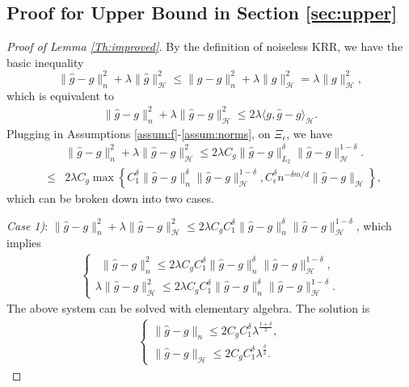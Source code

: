 \documentclass[12pt]{article}
\theoremstyle{plain}
\theoremstyle{remark}
\begin{document}
\subsection{Proof for Upper Bound in Section \ref{sec:upper}} \label{sub:upp}
 \begin{proof}[Proof of Lemma \ref{Th:improved}]
    By the definition of noiseless KRR, we have the basic inequality
\[\|\hat{g}-g\|_n^2+\lambda \|\hat{g}\|^2_{\mathcal{H}}\leq \|g-g\|^2_n + \lambda \|g\|^2_\mathcal{H}=\lambda \|g\|^2_\mathcal{H},\]
which is equivalent to
\begin{eqnarray*}
    \|\hat{g}-g\|_n^2+\lambda \|\hat{g}-g\|^2_{\mathcal{H}}\leq 2 \lambda \langle g, \hat{g}-g\rangle_{\mathcal{H}}.
\end{eqnarray*}
Plugging in Assumptions \ref{assum:f}-\ref{assum:norms}, on $\Xi_\epsilon$, we have
\begin{eqnarray*}
    &&\|\hat{g}-g\|_n^2+\lambda \|\hat{g}-g\|^2_{\mathcal{H}}\leq 2 \lambda C_g \|\hat{g}-g\|_{L_2}^{\delta}\|\hat{g}-g\|_{\mathcal{H}}^{1-\delta}.\\
    &\leq& 2 \lambda C_g\max\left\{C_1^\delta\|\hat{g}-g\|^{\delta}_n\|\hat{g}-g\|_{\mathcal{H}}^{1-\delta},C_\epsilon^\delta n^{-\delta m/d}\|\hat{g}-g\|_{\mathcal{H}}\right\},
\end{eqnarray*}
which can be broken down into two cases.

\textit{Case 1)}: $\|\hat{g}-g\|_n^2+\lambda \|\hat{g}-g\|^2_{\mathcal{H}}\leq 2 \lambda C_gC_1^\delta\|\hat{g}-g\|^{\delta}_n\|\hat{g}-g\|_{\mathcal{H}}^{1-\delta}$, which implies
\begin{eqnarray}\label{needed_for_lower}
    \begin{cases}
        ~~\|\hat{g}-g\|_n^2\leq 2 \lambda C_gC_1^\delta\|\hat{g}-g\|^{\delta}_n\|\hat{g}-g\|_{\mathcal{H}}^{1-\delta},\\
        \lambda \|\hat{g}-g\|^2_{\mathcal{H}}\leq 2 \lambda C_gC_1^\delta\|\hat{g}-g\|^{\delta}_n\|\hat{g}-g\|_{\mathcal{H}}^{1-\delta}.
    \end{cases}
\end{eqnarray}
The above system can be solved with elementary algebra. The solution is
\begin{eqnarray}\label{case1}
    \begin{cases}
        \|\hat{g}-g\|_n\leq 2C_gC_1^\delta\lambda^{\frac{1+\delta}{2}},\\
        \|\hat{g}-g\|_\mathcal{H}\leq 2C_gC_1^\delta\lambda^{\frac{\delta}{2}}.
    \end{cases}
\end{eqnarray}


\end{proof}
\end{document}
